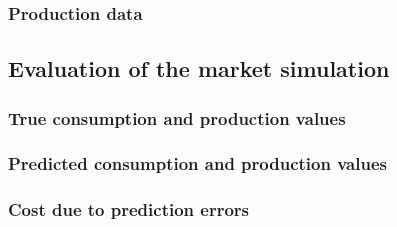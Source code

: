 \subsubsection{Production data}





\subsection{Evaluation of the market simulation}\label{Sec:Results;Subsec:Simulation}



\subsubsection{True consumption and production values}



\subsubsection{Predicted consumption and production values}



\subsubsection{Cost due to prediction errors}




